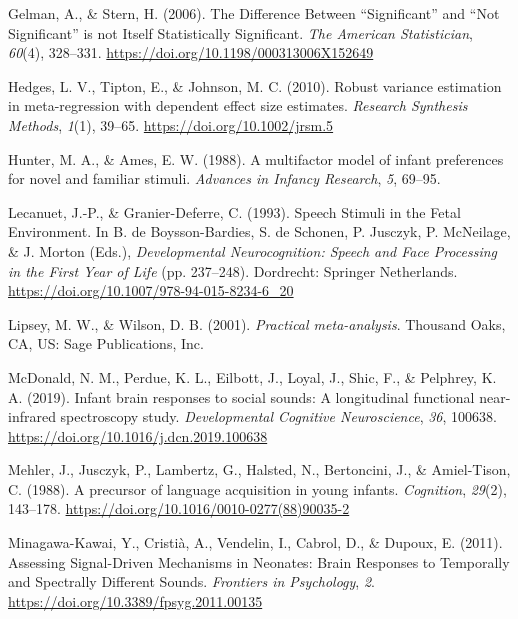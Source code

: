 \documentclass[
  english,
  man]{apa6}
\newlength{\cslhangindent}
\newlength{\cslentryspacingunit} %
\newenvironment{CSLReferences}[2] %
 {%
  \setlength{\parindent}{0pt}
  \ifodd #1
  \let\oldpar\par
  \def\par{\hangindent=\cslhangindent\oldpar}
  \fi
  \setlength{\parskip}{#2\cslentryspacingunit}
 }%
 {}
\begin{document}
\begin{CSLReferences}{1}{0}
\leavevmode{}%
Gelman, A., \& Stern, H. (2006). The {Difference} {Between} {``{Significant}''} and {``{Not} {Significant}''} is not {Itself} {Statistically} {Significant}. \emph{The American Statistician}, \emph{60}(4), 328--331. \url{https://doi.org/10.1198/000313006X152649}

\leavevmode{}%
Hedges, L. V., Tipton, E., \& Johnson, M. C. (2010). Robust variance estimation in meta-regression with dependent effect size estimates. \emph{Research Synthesis Methods}, \emph{1}(1), 39--65. \url{https://doi.org/10.1002/jrsm.5}

\leavevmode{}%
Hunter, M. A., \& Ames, E. W. (1988). A multifactor model of infant preferences for novel and familiar stimuli. \emph{Advances in Infancy Research}, \emph{5}, 69--95.

\leavevmode{}%
Lecanuet, J.-P., \& Granier-Deferre, C. (1993). Speech {Stimuli} in the {Fetal} {Environment}. In B. de Boysson-Bardies, S. de Schonen, P. Jusczyk, P. McNeilage, \& J. Morton (Eds.), \emph{Developmental {Neurocognition}: {Speech} and {Face} {Processing} in the {First} {Year} of {Life}} (pp. 237--248). Dordrecht: Springer Netherlands. \url{https://doi.org/10.1007/978-94-015-8234-6_20}

\leavevmode{}%
Lipsey, M. W., \& Wilson, D. B. (2001). \emph{Practical meta-analysis}. Thousand Oaks, CA, US: Sage Publications, Inc.

\leavevmode{}%
McDonald, N. M., Perdue, K. L., Eilbott, J., Loyal, J., Shic, F., \& Pelphrey, K. A. (2019). Infant brain responses to social sounds: {A} longitudinal functional near-infrared spectroscopy study. \emph{Developmental Cognitive Neuroscience}, \emph{36}, 100638. \url{https://doi.org/10.1016/j.dcn.2019.100638}

\leavevmode{}%
Mehler, J., Jusczyk, P., Lambertz, G., Halsted, N., Bertoncini, J., \& Amiel-Tison, C. (1988). A precursor of language acquisition in young infants. \emph{Cognition}, \emph{29}(2), 143--178. \url{https://doi.org/10.1016/0010-0277(88)90035-2}

\leavevmode{}%
Minagawa-Kawai, Y., Cristià, A., Vendelin, I., Cabrol, D., \& Dupoux, E. (2011). Assessing {Signal}-{Driven} {Mechanisms} in {Neonates}: {Brain} {Responses} to {Temporally} and {Spectrally} {Different} {Sounds}. \emph{Frontiers in Psychology}, \emph{2}. \url{https://doi.org/10.3389/fpsyg.2011.00135}


\end{CSLReferences}
\end{document}

